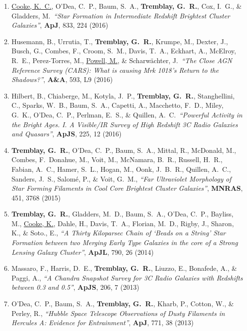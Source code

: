\documentclass[11pt]{article}
\begin{document}
\begin{enumerate}
\item \uline{Cooke, K.~C.}, O'Dea, C.~P., Baum, S.~A., \textbf{Tremblay, G.~R.}, Cox, I.~G., \& Gladders, M.\ \textit{``Star Formation in Intermediate Redshift Brightest Cluster Galaxies''}, \textbf{ApJ}, 833, 224 (2016)


\item Husemann, B., Urrutia, T., \textbf{Tremblay, G.~R.}, Krumpe, M., Dexter, J., Busch, G., Combes, F., Croom, S.~M., Davis, T.~A., Eckhart, A., McElroy, R.~E., Perez-Torres, M., \uline{Powell, M.}, \& Scharw\"{a}chter, J.\ \textit{``The Close AGN Reference Survey (CARS): What is causing Mrk 1018's Return to the Shadows?''}, \textbf{A\&A}, 593, L9 (2016)



\item Hilbert, B., Chiaberge, M., Kotyla, J.~P., \textbf{Tremblay, G.~R.}, Stanghellini, C., Sparks, W.~B., Baum, S.~A., Capetti, A., Macchetto, F.~D., Miley, G.~K., O'Dea, C.~P., Perlman, E.~S., \& Quillen, A.~C.\ \textit{``Powerful Activity in the Bright Ages. I. A Visible/IR Survey of High Redshift 3C Radio Galaxies and Quasars''}, \textbf{ApJS}, 225, 12  (2016)


\item \textbf{Tremblay, G.~R.}, O'Dea, C.~P., Baum, S.~A., Mittal, R., McDonald, M., Combes, F.~Donahue, M., Voit, M., McNamara, B.~R., Russell, H.~R., Fabian, A.~C., Hamer, S.~L., Hogan, M., Oonk, J.~B.~R., Quillen, A.~C., Sanders, J.~S., Salom\'{e}, P., \& Voit, G.~M., \textit{``Far Ultraviolet Morphology of Star Forming Filaments in Cool Core Brightest Cluster Galaxies''}, \textbf{MNRAS}, 451, 3768 (2015)

\item \textbf{Tremblay, G.~R.}, Gladders, M.~D., Baum, S.~A., O'Dea, C.~P., Bayliss, M., \uline{Cooke, K.}, Dahle, H., Davis, T.~A., Florian, M.~D., Rigby, J., Sharon, K., \& Soto., E.,   \textit{``A Thirty Kiloparsec Chain of `Beads on a String' Star Formation between two Merging Early Type Galaxies in the core of a Strong Lensing Galaxy Cluster''}, \textbf{ApJL}, 790, 26 (2014)


\item Massaro, F., Harris, D.~E., \textbf{Tremblay, G.~R.}, Liuzzo, E., Bonafede, A.,
\& Paggi, A., \textit{``A Chandra Snapshot Survey for 3C Radio Galaxies with Redshifts between 0.3 and 0.5''}, \textbf{ApJS}, 206,  7 (2013)


\item O'Dea, C.~P., Baum, S.~A., \textbf{Tremblay, G.~R.}, Kharb, P., Cotton, W.,
\& Perley, R.,  \textit{``Hubble Space Telescope Observations of Dusty Filaments in Hercules A: Evidence for Entrainment''}, \textbf{ApJ}, 771,  38 (2013)



\end{enumerate}
\end{document}
